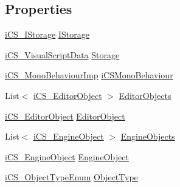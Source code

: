 \subsection*{Properties}
\begin{DoxyCompactItemize}
\item 
\hyperlink{classi_c_s___i_storage}{i\+C\+S\+\_\+\+I\+Storage} \hyperlink{classi_c_s___editor_object_a359db7e39433aadcd0e71c345777be47}{I\+Storage}
\item 
\hyperlink{classi_c_s___visual_script_data}{i\+C\+S\+\_\+\+Visual\+Script\+Data} \hyperlink{classi_c_s___editor_object_a74c2d3def2e003fb7a40cf394fbe54f1}{Storage}
\item 
\hyperlink{classi_c_s___mono_behaviour_imp}{i\+C\+S\+\_\+\+Mono\+Behaviour\+Imp} \hyperlink{classi_c_s___editor_object_aaba233ad25c3953146983f967a9549c4}{i\+C\+S\+Mono\+Behaviour}
\item 
List$<$ \hyperlink{classi_c_s___editor_object}{i\+C\+S\+\_\+\+Editor\+Object} $>$ \hyperlink{classi_c_s___editor_object_a5a97610d2d0a18cb42d705356b78b95b}{Editor\+Objects}
\item 
\hyperlink{classi_c_s___editor_object}{i\+C\+S\+\_\+\+Editor\+Object} \hyperlink{classi_c_s___editor_object_af1d6e714525df8f8caf3cd18c3440c96}{Editor\+Object}
\item 
List$<$ \hyperlink{classi_c_s___engine_object}{i\+C\+S\+\_\+\+Engine\+Object} $>$ \hyperlink{classi_c_s___editor_object_a3b690a386bd7f25fbe3197a2df476b9f}{Engine\+Objects}
\item 
\hyperlink{classi_c_s___engine_object}{i\+C\+S\+\_\+\+Engine\+Object} \hyperlink{classi_c_s___editor_object_abb22fd4696d50a2a55726bf825241c90}{Engine\+Object}
\item 
\hyperlink{i_c_s___object_type_enum_8cs_ae6c3dd6d8597380b56d94908eb431547}{i\+C\+S\+\_\+\+Object\+Type\+Enum} \hyperlink{classi_c_s___editor_object_ae046107fbcd9d62d93a431caea3ea3a5}{Object\+Type}

\end{DoxyCompactItemize}
